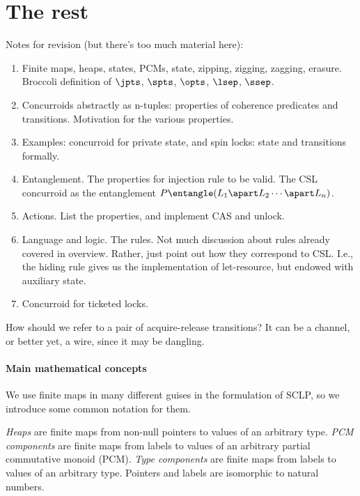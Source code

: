 \section{The rest}\label{sec:concurroids}

Notes for revision (but there's too much material here):
\begin{enumerate}
\item Finite maps, heaps, states, PCMs, state, zipping, zigging,
  zagging, erasure. Broccoli definition of $\jpts$, $\spts$, $\opts$,
  $\lsep$, $\ssep$.
\item Concurroids abstractly as n-tuples: properties of coherence predicates and
  transitions. Motivation for the various properties.
\item Examples: concurroid for private state, and spin locks: state
  and transitions formally.
\item Entanglement. The properties for injection rule to be valid. The
  CSL concurroid as the entanglement $P \entangle (L_1 \apart L_2
  \cdots \apart L_n)$.
\item Actions. List the properties, and implement CAS and unlock.
\item Language and logic. The rules. Not much discussion about rules
  already covered in overview. Rather, just point out how they
  correspond to CSL. I.e., the hiding rule gives us the implementation
  of let-resource, but endowed with auxiliary state.
\item Concurroid for ticketed locks.
\end{enumerate}

How should we refer to a pair of acquire-release transitions? It can
be a channel, or better yet, a wire, since it may be dangling.

\paragraph{Main mathematical concepts}

We use finite maps in many different guises in the formulation of
SCLP, so we introduce some common notation for them.

\emph{Heaps} are finite maps from non-null pointers to values of an
arbitrary type. \emph{PCM components} are finite maps from labels to
values of an arbitrary partial commutative monoid (PCM). \emph{Type
  components} are finite maps from labels to values of an arbitrary
type. Pointers and labels are isomorphic to natural numbers.

